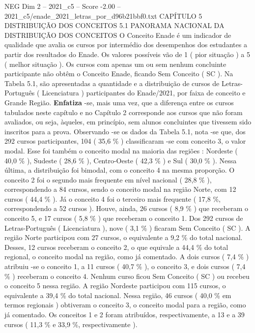 \begin{textsample}{NEG Dim 2 – 2021\_c5 – Score -2.00 – 2021\_c5/enade\_2021\_letras\_por\_d96b21bbf0.txt}  \label{ex:f2_neg_145}
CAPÍTULO 5 DISTRIBUIÇÃO DOS CONCEITOS 5.1 PANORAMA NACIONAL DA DISTRIBUIÇÃO DOS CONCEITOS O Conceito Enade é um indicador de qualidade que avalia os cursos por intermédio dos desempenhos dos estudantes a partir dos resultados do Enade.
Os valores possíveis vão de 1 ( pior situação ) a 5 ( melhor situação ).
Os cursos com apenas um ou sem nenhum concluinte participante não obtêm o Conceito Enade, ficando Sem Conceito ( SC ).
Na Tabela 5.1, são apresentadas a quantidade e a distribuição de cursos de Letras-Português ( Licenciatura ) participantes do Enade/2021, por faixa de conceito e Grande Região. \textbf{Enfatiza} -se, mais uma vez, que a diferença entre os cursos tabulados neste capítulo e no Capítulo 2 corresponde aos cursos que não foram avaliados, ou seja, àqueles, em princípio, sem alunos concluintes que tivessem sido inscritos para a prova.
Observando -se os dados da Tabela 5.1, nota -se que, dos 292 cursos participantes, 104 ( 35,6 \% ) classificaram -se com conceito 3, o valor modal.
Esse foi também o conceito modal na maioria das regiões : Nordeste ( 40,0 \% ), Sudeste ( 28,6 \% ), Centro-Oeste ( 42,3 \% ) e Sul ( 30,0 \% ).
Nessa última, a distribuição foi bimodal, com o conceito 4 na mesma proporção.
O conceito 2 foi o segundo mais frequente em nível nacional ( 28,8 \% ), correspondendo a 84 cursos, sendo o conceito modal na região Norte, com 12 cursos ( 44,4 \% ).
Já o conceito 4 foi o terceiro mais frequente ( 17,8 \%, correspondendo a 52 cursos ).
Houve, ainda, 26 cursos ( 8,9 \% ) que receberam o conceito 5, e 17 cursos ( 5,8 \% ) que receberam o conceito 1.
Dos 292 cursos de Letras-Português ( Licenciatura ), nove ( 3,1 \% ) ficaram Sem Conceito ( SC ).
A região Norte participou com 27 cursos, o equivalente a 9,2 \% do total nacional.
Desses, 12 cursos receberam o conceito 2, o que equivale a 44,4 \% do total regional, o conceito modal na região, como já comentado.
A dois cursos ( 7,4 \% ) atribuiu -se o conceito 1, a 11 cursos ( 40,7 \% ), o conceito 3, e dois cursos ( 7,4 \% ) receberam o conceito 4.
Nenhum curso ficou Sem Conceito ( SC ) ou recebeu o conceito 5 nessa região.
A região Nordeste participou com 115 cursos, o equivalente a 39,4 \% do total nacional.
Nessa região, 46 cursos ( 40,0 \% em termos regionais ) obtiveram o conceito 3, o conceito modal para a região, como já comentado.
Os conceitos 1 e 2 foram atribuídos, respectivamente, a 13 e a 39 cursos ( 11,3 \% e 33,9 \%, respectivamente ).

\end{textsample}
